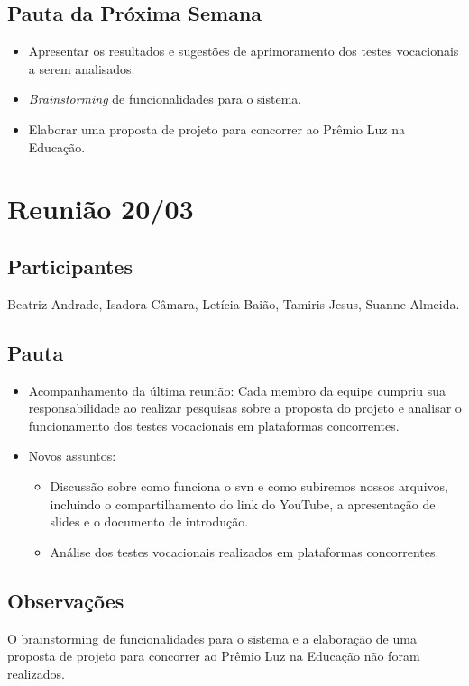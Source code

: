 \begin{apendicesenv}
\subsection*{Pauta da Próxima Semana}
\begin{itemize}
    \item Apresentar os resultados e sugestões de aprimoramento dos testes vocacionais a serem analisados.
    \item \textit{Brainstorming} de funcionalidades para o sistema.
    \item Elaborar uma proposta de projeto para concorrer ao Prêmio Luz na Educação.
\end{itemize}

\section*{Reunião 20/03}

\subsection*{Participantes}
Beatriz Andrade, Isadora Câmara, Letícia Baião, Tamiris Jesus, Suanne Almeida.

\subsection*{Pauta}
\begin{itemize}
    \item Acompanhamento da última reunião: Cada membro da equipe cumpriu sua responsabilidade ao realizar pesquisas sobre a proposta do projeto e analisar o funcionamento dos testes vocacionais em plataformas concorrentes.
    \item Novos assuntos:
    \begin{itemize}
        \item Discussão sobre como funciona o \ac{svn} e como subiremos nossos arquivos, incluindo o compartilhamento do link do YouTube, a apresentação de slides e o documento de introdução.
        \item Análise dos testes vocacionais realizados em plataformas concorrentes.
    \end{itemize}
\end{itemize}

\subsection*{Observações}
O brainstorming de funcionalidades para o sistema e a elaboração de uma proposta de projeto para concorrer ao Prêmio Luz na Educação não foram realizados.


\end{apendicesenv}
